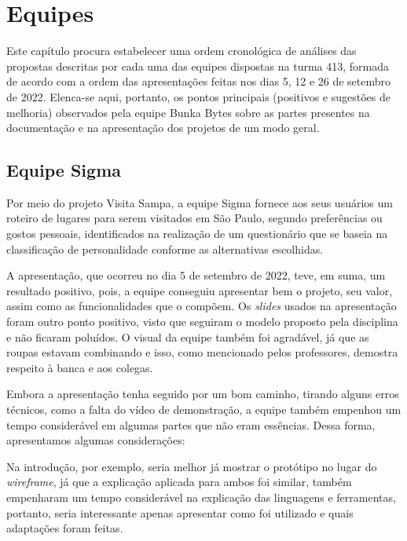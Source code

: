 
\chapter{Equipes}
Este capítulo procura estabelecer uma ordem cronológica de análises das propostas descritas por cada uma das equipes dispostas na turma 413, formada de acordo com a ordem das apresentações feitas nos dias 5, 12 e 26 de setembro de 2022. Elenca-se aqui, portanto, os pontos principais (positivos e sugestões de melhoria) observados pela equipe Bunka Bytes sobre as partes presentes na documentação e na apresentação dos projetos de um modo geral.

\section{Equipe Sigma}
Por meio do projeto Visita Sampa, a equipe Sigma fornece aos seus usuários um roteiro de lugares para serem visitados em São Paulo, segundo preferências ou gostos pessoais, identificados na realização de um questionário que se baseia na classificação de personalidade conforme as alternativas escolhidas.

A apresentação, que ocorreu no dia 5 de setembro de 2022, teve, em suma, um resultado positivo, pois, a equipe conseguiu apresentar bem o projeto, seu valor, assim como as funcionalidades que o compõem. Os \textit{slides} usados na apresentação foram outro ponto positivo, visto que seguiram o modelo proposto pela disciplina e não ficaram poluídos. O visual da equipe também foi agradável, já que as roupas estavam combinando e isso, como mencionado pelos professores, demostra respeito à banca e aos colegas.

Embora a apresentação tenha seguido por um bom caminho, tirando alguns erros técnicos, como a falta do vídeo de demonstração, a equipe também empenhou um tempo considerável em algumas partes que não eram essências. Dessa forma, apresentamos algumas considerações: 

Na introdução, por exemplo, seria melhor já mostrar o protótipo no lugar do \textit{wireframe}, já que a explicação aplicada para ambos foi similar, também empenharam um tempo considerável na explicação das linguagens e ferramentas, portanto, seria interessante apenas apresentar como foi utilizado e quais adaptações foram feitas.

